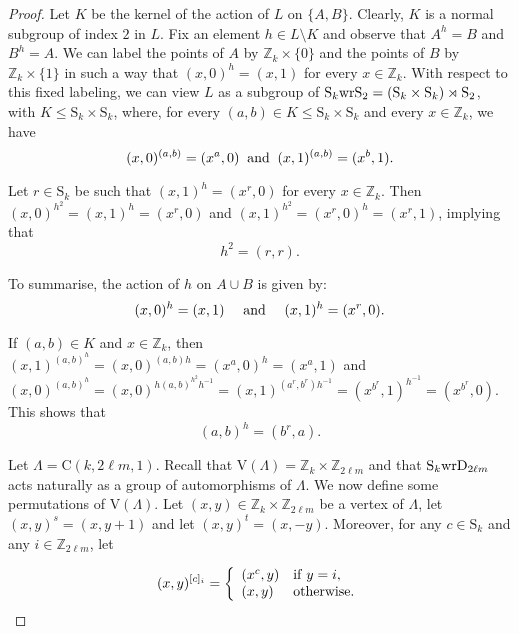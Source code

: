 \documentclass{amsart}
\theoremstyle{definition}
\begin{document}
\begin{proof}
Let $K$ be the kernel of the action of $L$ on $\{A,B\}$. Clearly, $K$ is a normal subgroup of index $2$ in $L$. Fix an element $h\in L\setminus K$ and observe that $A^h=B$ and $B^h=A$. We can label the points of $A$ by ${\mathbb Z}_k\times\{0\}$ and the points of $B$ by ${\mathbb Z}_k\times\{1\}$ in such a way that $(x,0)^h=(x,1)$ for every $x\in{\mathbb Z}_k$. With respect to this fixed labeling, we can view $L$ as a subgroup of ${\mathrm{S}}_k{\mathop{\rm wr}}{\mathrm{S}}_2=({\mathrm{S}}_k\times {\mathrm{S}}_k)\rtimes {\mathrm{S}}_2$, with $K\le {\mathrm{S}}_k\times {\mathrm{S}}_k$, where, for every $(a,b)\in K \le {\mathrm{S}}_k\times {\mathrm{S}}_k$ and every $x\in{\mathbb Z}_k$, we have 
\begin{equation}
(x,0)^{(a,b)}=(x^a,0)\>  \hbox{ and } \> (x,1)^{(a,b)}=(x^b,1).
\end{equation}

Let $r\in {\mathrm{S}}_k$ be such that $(x,1)^h = (x^r,0)$ for every $x\in {\mathbb Z}_k$. Then $(x,0)^{h^2} = (x,1)^h = (x^r,0)$ and $(x,1)^{h^2} = (x^r,0)^h = (x^r,1)$,
implying that 
\begin{equation}\label{eq:h2}
h^2=(r,r).
\end{equation}

To summarise, the action of $h$ on $A \cup B$ is given by:
\begin{equation}
\label{eqn:h}
 (x,0)^h = (x,1) \quad \hbox{ and } \quad (x,1)^h = (x^r,0).
\end{equation}

If $(a,b)\in K$ and $x\in{\mathbb Z}_k$, then $(x,1)^{(a,b)^h}=(x,0)^{(a,b)h}=(x^a,0)^h=(x^a,1)$ and $(x,0)^{(a,b)^h}=(x,0)^{h(a,b)^{h^2}h^{-1}}=(x,1)^{(a^r,b^r)h^{-1}}=(x^{b^r},1)^{h^{-1}}=(x^{b^r},0)$. This shows that
\begin{equation}
\label{eq:abh}
(a,b)^h=(b^r,a).
\end{equation}

Let $\Lambda={\mathrm C}(k,2\ell m,1)$. Recall that ${\mathrm V}(\Lambda)={\mathbb Z}_k\times {\mathbb Z}_{2\ell m}$ and that ${\mathrm{S}}_k {\mathop{\rm wr}} {\mathrm D}_{2\ell m}$ acts naturally as a group of automorphisms of $\Lambda$. We now define some permutations of ${\mathrm V}(\Lambda)$. Let $(x,y)\in {\mathbb Z}_k\times {\mathbb Z}_{2\ell m}$ be a vertex of $\Lambda$, let $(x,y)^s=(x,y+1)$ and let $(x,y)^t=(x,-y)$. Moreover, for any $c\in{\mathrm{S}}_k$ and any $i\in {\mathbb Z}_{2\ell m}$, let 

\begin{displaymath}
   (x,y)^{[c]_i} = \left\{
     \begin{array}{ll}
       (x^c,y) & {\rm if}\; y = i ,\\
       (x,y) & {\rm otherwise.}
     \end{array}
   \right.
\end{displaymath}  


\end{proof}
\end{document}
